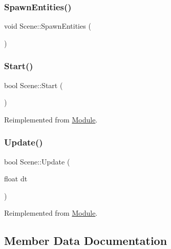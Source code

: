 \subsubsection{\texorpdfstring{SpawnEntities()}{SpawnEntities()}}
{\footnotesize\ttfamily void Scene\+::\+Spawn\+Entities (\begin{DoxyParamCaption}{ }\end{DoxyParamCaption})}

\mbox{\label{class_scene_a4be9030f1269eb74266ea1067d07f56f}} 
\subsubsection{\texorpdfstring{Start()}{Start()}}
{\footnotesize\ttfamily bool Scene\+::\+Start (\begin{DoxyParamCaption}{ }\end{DoxyParamCaption})\hspace{0.3cm}{\ttfamily [virtual]}}



Reimplemented from \mbox{\hyperlink{class_module_aaf67046743296e8de310039a1dc95d86}{Module}}.

\mbox{\label{class_scene_a3b7592b8a1ec0317edad4f694ea2d99c}} 
\subsubsection{\texorpdfstring{Update()}{Update()}}
{\footnotesize\ttfamily bool Scene\+::\+Update (\begin{DoxyParamCaption}\item[{float}]{dt }\end{DoxyParamCaption})\hspace{0.3cm}{\ttfamily [virtual]}}



Reimplemented from \mbox{\hyperlink{class_module_ac1a7b6dca73586b9cce2e67647af58d8}{Module}}.



\subsection{Member Data Documentation}
\mbox{\label{class_scene_ab88fa0069665871b5c8573ddacf7e538}} 
